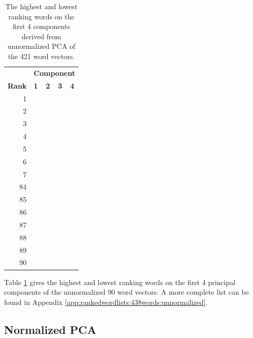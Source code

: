 \documentclass[10pt,letterpaper]{book}
\begin{document}
\begin{table}[!htbp]
    \begin{tabular}{| rllll | }
        \hline
         & \multicolumn{4}{c|}{\textbf{Component}} \\
        \textbf{Rank} & \textbf{1} & \textbf{2} & \textbf{3} & \textbf{4} \\
        \hline
        1 &  &  &  &  \\
        2 &  &  &  &  \\
        3 &  &  &  &  \\
        4 &  &  &  &  \\
        5 &  &  &  &  \\
        6 &  &  &  &  \\
        7 &  &  &  &  \\
        \hline
        84 &  &  &  &  \\
        85 &  &  &  &  \\
        86 &  &  &  &  \\
        87 &  &  &  &  \\
        88 &  &  &  &  \\
        89 &  &  &  &  \\
        90 &  &  &  &  \\
        \hline
    \end{tabular}
    \caption{The highest and lowest ranking words on the first 4 components 
    derived from unnormalized PCA of the 421 word vectors.}
    \label{tab:438wordsRankingsUnnormalizedPCA}
\end{table}

Table \ref{tab:438wordsRankingsUnnormalizedPCA} gives the highest and lowest
ranking words on the first 4 principal components of the unnormalized 90 word 
vectors. A more complete list can be found in Appendix 
\ref{app:rankedwordlists:438words:unnormalized}.


\subsection{Normalized PCA}
\end{document}
